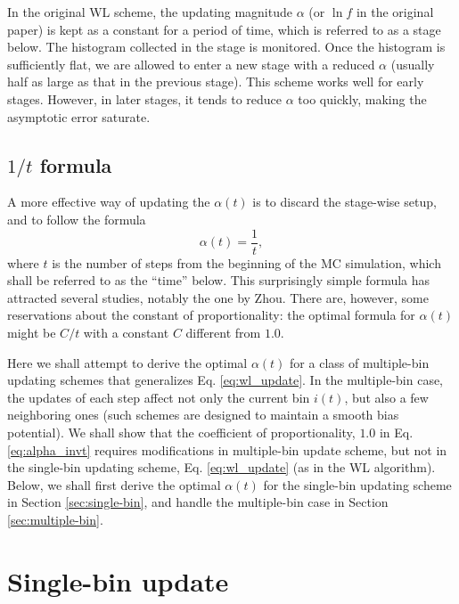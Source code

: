\documentclass[reprint]{revtex4-1}
\begin{document}
In the original WL scheme,
the updating magnitude $\alpha$ (or $\ln f$
in the original paper) is kept as a constant
for a period of time,
which is referred to as a stage below.
%
The histogram collected in the stage is monitored.
%
Once the histogram is sufficiently flat,
we are allowed to enter a new stage
with a reduced $\alpha$
(usually half as large as
that in the previous stage).
%
This scheme works well for early stages.
%
However, in later stages, it tends to reduce $\alpha$
too quickly, making the asymptotic error
saturate.



\subsection{$1/t$ formula}



A more effective way
of updating the $\alpha(t)$
is to discard the stage-wise setup,
and to follow the formula
%
\begin{equation}
  \alpha(t) = \frac{1}{t},
  \label{eq:alpha_invt}
\end{equation}
%
where $t$ is the number of steps
from the beginning of the MC simulation,
which shall be referred to as the ``time'' below.
%
This surprisingly simple formula has attracted
several studies, notably the one by Zhou.
%
There are, however, some reservations about
the constant of proportionality:
the optimal formula for $\alpha(t)$
might be $C/t$ with a constant $C$
different from $1.0$.



Here we shall attempt to derive
the optimal $\alpha(t)$ for a class of
multiple-bin updating schemes
that generalizes Eq. \eqref{eq:wl_update}.
%
In the multiple-bin case,
the updates of each step affect
not only the current bin $i(t)$,
but also a few neighboring ones
(such schemes are designed
to maintain a smooth bias potential).
%
We shall show that
the coefficient of proportionality, $1.0$
in Eq. \eqref{eq:alpha_invt}
requires modifications in multiple-bin update scheme,
but not in the single-bin updating scheme,
Eq. \eqref{eq:wl_update}
(as in the WL algorithm).
%
Below, we shall first derive the optimal $\alpha(t)$
for the single-bin updating scheme
in Section \ref{sec:single-bin},
and handle the multiple-bin case
in Section \ref{sec:multiple-bin}.



\section{\label{sec:single-bin}
Single-bin update}
\end{document}
